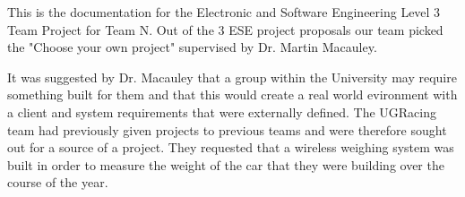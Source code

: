 This is the documentation for the Electronic and Software Engineering Level 3 Team Project for Team N. Out of the 3 ESE project proposals our team picked the "Choose your own project" supervised by Dr. Martin Macauley.

It was suggested by Dr. Macauley that a group within the University may require something built for them and that this would create a real world evironment with a client and system requirements that were externally defined. The UGRacing team had previously given projects to previous teams and were therefore sought out for a source of a project. They requested that a wireless weighing system was built in order to measure the weight of the car that they were building over the course of the year. 

